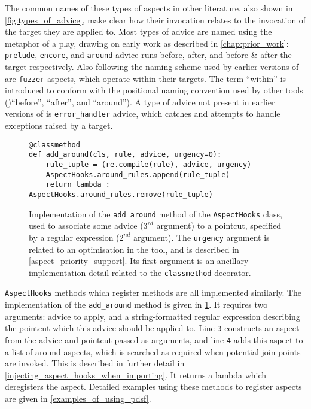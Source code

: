 The common names of these types of aspects in other literature, also shown in
\cref{fig:types_of_advice}, make clear how their invocation relates to the
invocation of the target they are applied to. Most types of advice are named
using the metaphor of a play, drawing on early \theatreag{} work as described in
\cref{chap:prior_work}: \lstinline{prelude}, \lstinline{encore}, and
\lstinline{around} advice runs before, after, and before \& after the target
respectively. Also following the naming scheme used by earlier versions of
\pdsf{} are \lstinline{fuzzer} aspects, which operate within their targets. The
term ``within'' is introduced to conform with the positional naming convention
used by other tools ()``before'', ``after'', and
``around''). A
type of advice not present in earlier versions of \pdsf{} is
\lstinline{error_handler} advice, which catches and attempts to handle
exceptions raised by a target.

\begin{figure}
    \begin{lstlisting}
@classmethod
def add_around(cls, rule, advice, urgency=0):
    rule_tuple = (re.compile(rule), advice, urgency)
    AspectHooks.around_rules.append(rule_tuple)
    return lambda : AspectHooks.around_rules.remove(rule_tuple)
    \end{lstlisting}
    \caption{Implementation of the \lstinline{add_around} method of the
    \lstinline{AspectHooks} class, used to associate some advice ($3^{rd}$
    argument) to a pointcut, specified by a regular expression ($2^{nd}$
    argument). The \lstinline{urgency} argument is related to an optimisation
    in the tool, and is described in \cref{aspect_priority_support}. Its first
    argument is an ancillary implementation detail related to the
    \lstinline{classmethod} decorator.}
    \label{fig:add_around_impl}
\end{figure}


\lstinline{AspectHooks} methods which register methods are all implemented
similarly. The implementation of the \lstinline{add_around} method is given in
\cref{fig:add_around_impl}. It requires two arguments: advice to apply, and a
string-formatted regular expression describing the pointcut which this advice
should be applied to. Line \texttt{3} constructs an aspect from the advice and
pointcut passed as arguments, and line \texttt{4} adds this aspect to a list of
around aspects, which is searched as required when potential join-points are
invoked. This is described in further detail in
\cref{injecting_aspect_hooks_when_importing}. It returns a lambda which
deregisters the aspect. Detailed examples using these methods to register
aspects are given in \cref{examples_of_using_pdsf}.


